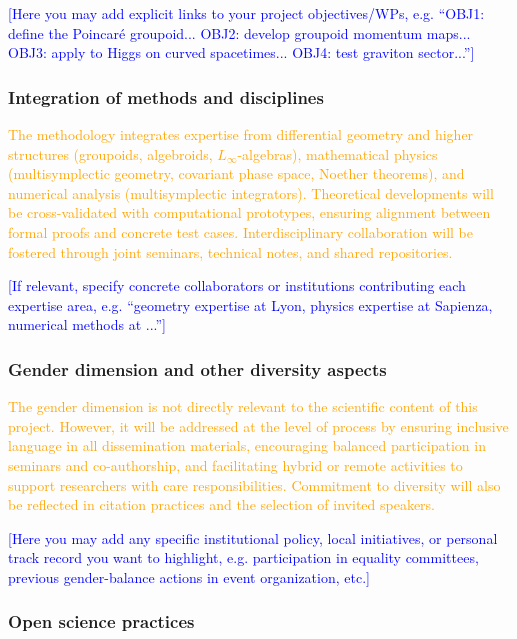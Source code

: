 \documentclass[11pt,draftproposal]{msca-pf}
\begin{document}
\textcolor{blue}{[Here you may add explicit links to your project objectives/WPs, e.g. ``OBJ1: define the Poincaré groupoid... OBJ2: develop groupoid momentum maps... OBJ3: apply to Higgs on curved spacetimes... OBJ4: test graviton sector...'']}


\subsubsection*{Integration of methods and disciplines}

\textcolor{orange}{The methodology integrates expertise from differential geometry and higher structures (groupoids, algebroids, $L_\infty$-algebras), mathematical physics (multisymplectic geometry, covariant phase space, Noether theorems), and numerical analysis (multisymplectic integrators). Theoretical developments will be cross-validated with computational prototypes, ensuring alignment between formal proofs and concrete test cases. Interdisciplinary collaboration will be fostered through joint seminars, technical notes, and shared repositories.}

\textcolor{blue}{[If relevant, specify concrete collaborators or institutions contributing each expertise area, e.g. ``geometry expertise at Lyon, physics expertise at Sapienza, numerical methods at ...'']}  

\subsubsection*{Gender dimension and other diversity aspects}

\textcolor{orange}{The gender dimension is not directly relevant to the scientific content of this project. However, it will be addressed at the level of process by ensuring inclusive language in all dissemination materials, encouraging balanced participation in seminars and co-authorship, and facilitating hybrid or remote activities to support researchers with care responsibilities. Commitment to diversity will also be reflected in citation practices and the selection of invited speakers.} 

\textcolor{blue}{[Here you may add any specific institutional policy, local initiatives, or personal track record you want to highlight, e.g. participation in equality committees, previous gender-balance actions in event organization, etc.]}

\subsubsection*{Open science practices}
\end{document}
